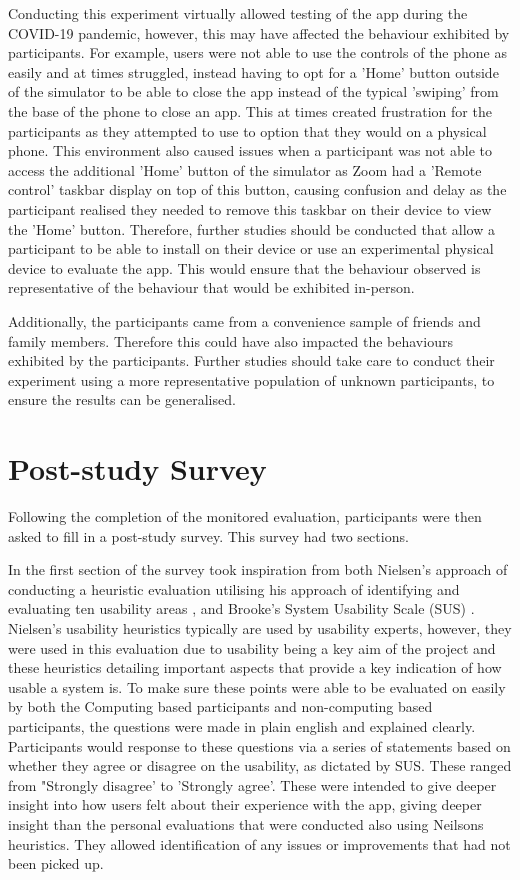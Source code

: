 \documentclass{l4proj}
\begin{document}
Conducting this experiment virtually allowed testing of the app during the COVID-19 pandemic, however, this may have affected the behaviour exhibited by participants. For example, users were not able to use the controls of the phone as easily and at times struggled, instead having to opt for a 'Home' button outside of the simulator to be able to close the app instead of the typical 'swiping' from the base of the phone to close an app. This at times created frustration for the participants as they attempted to use to option that they would on a physical phone. This environment also caused issues when a participant was not able to access the additional 'Home' button of the simulator as Zoom had a 'Remote control' taskbar display on top of this button, causing confusion and delay as the participant realised they needed to remove this taskbar on their device to view the 'Home' button. Therefore, further studies should be conducted that allow a participant to be able to install on their device or use an experimental physical device to evaluate the app. This would ensure that the behaviour observed is representative of the behaviour that would be exhibited in-person.

Additionally, the participants came from a convenience sample of friends and family members. Therefore this could have also impacted the behaviours exhibited by the participants. Further studies should take care to conduct their experiment using a more representative population of unknown participants, to ensure the results can be generalised.


\section{Post-study Survey}
Following the completion of the monitored evaluation, participants were then asked to fill in a post-study survey. This survey had two sections.

In the first section of the survey took inspiration from both Nielsen’s approach of conducting a heuristic evaluation utilising his approach of identifying and evaluating ten usability areas \citep{Nielsen10}, and Brooke's System Usability Scale (SUS) \citep{affairs_system_2013}. Nielsen's usability heuristics typically are used by usability experts, however, they were used in this evaluation due to usability being a key aim of the project and these heuristics detailing important aspects that provide a key indication of how usable a system is. To make sure these points were able to be evaluated on easily by both the Computing based participants and non-computing based participants, the questions were made in plain english and explained clearly. Participants would response to these questions via a series of statements based on whether they agree or disagree on the usability, as dictated by SUS. These ranged from "Strongly disagree' to 'Strongly agree'. These were intended to give deeper insight into how users felt about their experience with the app, giving deeper insight than the personal evaluations that were conducted also using Neilsons heuristics. They allowed identification of any issues or improvements that had not been picked up. 
\end{document}
